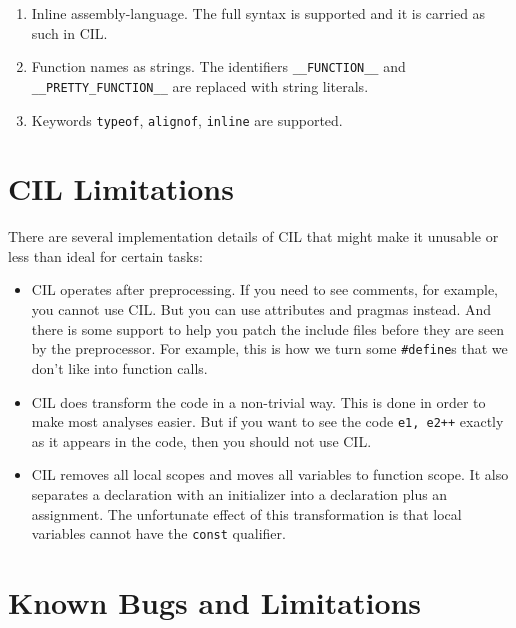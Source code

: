 \documentclass{article}
\def\t#1{{\tt #1}}
\begin{document}
\begin{enumerate}
\item Inline assembly-language. The full syntax is supported and it is carried
as such in CIL.

\item Function names as strings. The identifiers \t{\_\_FUNCTION\_\_} and
\t{\_\_PRETTY\_FUNCTION\_\_} are replaced with string literals. 

\item Keywords \t{typeof}, \t{alignof}, \t{inline} are supported. 
\end{enumerate}

\section{CIL Limitations}

 There are several implementation details of CIL that might make it unusable
 or less than ideal for certain tasks:

\begin{itemize}
\item CIL operates after preprocessing. If you need to see comments, for
example, you cannot use CIL. But you can use attributes and pragmas instead.
And there is some support to help you patch the include files before they are
seen by the preprocessor. For example, this is how we turn some
\t{\#define}s that we don't like into function calls. 

\item CIL does transform the code in a non-trivial way. This is done in order
to make most analyses easier. But if you want to see the code \t{e1, e2++}
exactly as it appears in the code, then you should not use CIL. 

\item CIL removes all local scopes and moves all variables to function
scope. It also separates a declaration with an initializer into a declaration
plus an assignment. The unfortunate effect of this transformation is that
local variables cannot have the \t{const} qualifier.

\end{itemize}
 
\section{Known Bugs and Limitations}
\end{document}
